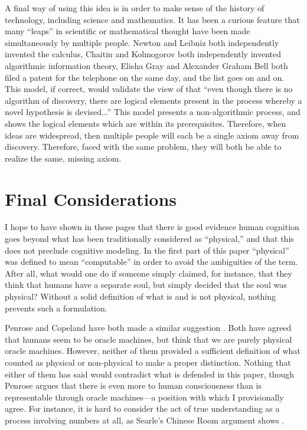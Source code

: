 A final way of using this idea is in order to make sense of the history of technology, including science and mathematics.  It has been a curious feature that many ``leaps'' in scientific or mathematical thought have been made simultaneously by multiple people.  Newton and Leibniz both independently invented the calculus, Chaitin and Kolmogorov both independently invented algorithmic information theory, Elisha Gray and Alexander Graham Bell both filed a patent for the telephone on the same day, and the list goes on and on.  This model, if correct, would validate the view of \citet{stokes1986} that ``even though there is no algorithm of discovery, there are logical elements present in the process whereby a novel hypothesis is devised...''  This model presents a non-algorithmic process, and shows the logical elements which are within its prerequisites.  Therefore, when ideas are widespread, then multiple people will each be a single axiom away from discovery.  Therefore, faced with the same problem, they will both be able to realize the same, missing axiom.

\section{Final Considerations}

I hope to have shown in these pages that there is good evidence human cognition goes beyond what has been traditionally considered as ``physical,'' and that this does not preclude cognitive modeling.  In the first part of this paper ``physical'' was defined to mean ``computable'' in order to avoid the ambiguities of the term.  After all, what would one do if someone simply claimed, for instance, that they think that humans have a separate soul, but simply decided that the soul was physical?  Without a solid definition of what is and is not physical, nothing prevents such a formulation.   

Penrose and Copeland have both made a similar suggestion \citep{copeland1998, hodges2000}.  Both have agreed that humans seem to be oracle machines, but think that we are purely physical oracle machines.  However, neither of them provided a sufficient definition of what counted as physical or non-physical to make a proper distinction.  Nothing that either of them has said would contradict what is defended in this paper, though Penrose argues that there is even more to human consciousness than is representable through oracle machines---a position with which I provisionally agree.   For instance, it is hard to consider the act of true understanding as a process involving numbers at all, as Searle's Chinese Room argument shows \citep{searle1980}.

